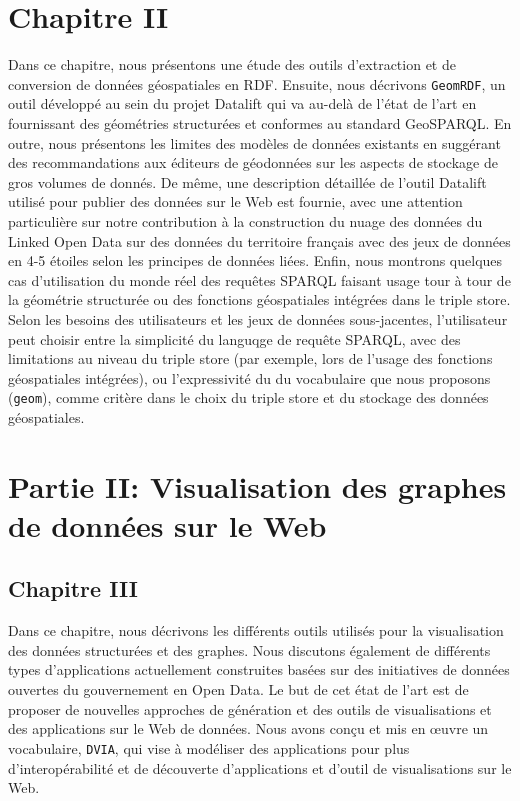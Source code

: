 \section*{Chapitre II}
Dans ce chapitre, nous pr\'{e}sentons une \'{e}tude des outils d'extraction et de conversion de donn\'{e}es g\'{e}ospatiales en RDF. Ensuite, nous d\'{e}crivons \texttt{GeomRDF}, un outil d\'{e}velopp\'{e} au sein du projet Datalift qui va au-delà de l'\'{e}tat de l'art en fournissant des g\'{e}om\'{e}tries structur\'{e}es et conformes au standard GeoSPARQL. En outre, nous pr\'{e}sentons les limites des mod\`{e}les de donn\'{e}es existants en sugg\'{e}rant des recommandations aux \'{e}diteurs de g\'{e}odonn\'{e}es sur les aspects de stockage de gros volumes de donn\'{e}s. De m\^{e}me, une description d\'{e}taill\'{e}e de l'outil Datalift utilis\'{e} pour publier des donn\'{e}es sur le Web est fournie, avec une attention particuli\`{e}re sur notre contribution à la construction du nuage des donn\'{e}es du Linked Open Data sur des donn\'{e}es du territoire français avec des jeux de donn\'{e}es en 4-5 \'{e}toiles selon les principes de donn\'{e}es li\'{e}es. Enfin, nous montrons quelques cas d'utilisation du monde r\'{e}el des requ\^{e}tes SPARQL faisant usage tour à tour de la g\'{e}om\'{e}trie structur\'{e}e ou des fonctions g\'{e}ospatiales int\'{e}gr\'{e}es dans le triple store. Selon les besoins des utilisateurs et les jeux de donn\'{e}es sous-jacentes, l'utilisateur peut choisir entre la simplicit\'{e} du languqge de requ\^{e}te SPARQL, avec des limitations au niveau du triple store (par exemple, lors de l'usage des fonctions g\'{e}ospatiales int\'{e}gr\'{e}es), ou l'expressivit\'{e} du du vocabulaire que nous proposons (\texttt{geom}), comme crit\`{e}re dans le choix du triple store et du stockage des donn\'{e}es g\'{e}ospatiales.

\section*{Partie II: Visualisation des graphes de donn\'{e}es sur le Web}

\subsection*{Chapitre III}
Dans ce chapitre, nous d\'{e}crivons les diff\'{e}rents outils utilis\'{e}s pour la visualisation des donn\'{e}es structur\'{e}es et des graphes. Nous discutons \'{e}galement de diff\'{e}rents types d'applications actuellement construites bas\'{e}es sur des initiatives de donn\'{e}es ouvertes du gouvernement en Open Data. Le but de cet \'{e}tat de l'art est de proposer de nouvelles approches de g\'{e}n\'{e}ration et des outils de visualisations et des applications sur le Web de donn\'{e}es. Nous avons conçu et mis en œuvre un vocabulaire, \texttt{DVIA}, qui vise à mod\'{e}liser des applications pour plus d'interop\'{e}rabilit\'{e} et de d\'{e}couverte d'applications et d'outil de visualisations  sur le Web.

